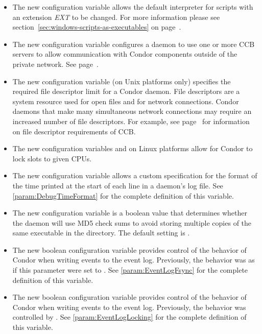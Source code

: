 \begin{itemize}

\item The new configuration variable 
allows the default interpreter for scripts with an extension \textit{EXT} to
be changed.  For more information please see
section~\ref{sec:windows-scripts-as-executables} on
page~\pageref{sec:windows-scripts-as-executables}.

\item The new configuration variable 
configures a daemon to use one or more
CCB servers to allow communication with Condor components outside of
the private network.  See page~\pageref{sec:CCB}.

\item The new configuration variable 
(on Unix platforms only) specifies the
required file descriptor limit for a Condor daemon.  File descriptors
are a system resource used for open files and for network connections.
Condor daemons that make many simultaneous network connections may
require an increased number of file descriptors.  For example, see
page~\pageref{sec:CCB} for information on file descriptor requirements
of CCB.

\item The new configuration variables  and 
 on Linux platforms allow for
Condor to lock slots to given CPUs.

\item The new configuration variable 
  allows a custom specification for the format of the time
  printed at the start of each line in a daemon's log file.
  See \ref{param:DebugTimeFormat} for the complete definition of
  this variable.

\item The new configuration variable 
  is a boolean value that determines whether the  daemon will
  use MD5 check sums to avoid storing multiple copies of the same
  executable in the  directory. The default setting is
  .

\item The new boolean configuration variable
   provides control of the behavior of
  Condor when writing events to the event log.  Previously,
  the behavior was as if this parameter were set to .
  See \ref{param:EventLogFsync} for the complete definition of
  this variable.

\item The new boolean configuration variable
   provides control of the behavior of
  Condor when writing events to the event log.  Previously,
  the behavior was controlled by .
  See \ref{param:EventLogLocking} for the complete definition of
  this variable.

\end{itemize}

